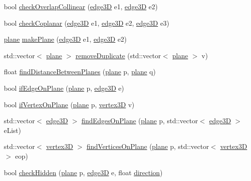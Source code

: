 \begin{DoxyCompactItemize}
\item 
bool \mbox{\hyperlink{namespacegeneral_methods_aa7662b2bcff30f8983da23da5edfc766}{check\+Overlap\+Collinear}} (\mbox{\hyperlink{structedge3_d}{edge3D}} e1, \mbox{\hyperlink{structedge3_d}{edge3D}} e2)
\item 
bool \mbox{\hyperlink{namespacegeneral_methods_a508d15a0c76920dc4f98cf8da254f9c4}{check\+Coplanar}} (\mbox{\hyperlink{structedge3_d}{edge3D}} e1, \mbox{\hyperlink{structedge3_d}{edge3D}} e2, \mbox{\hyperlink{structedge3_d}{edge3D}} e3)
\item 
\mbox{\hyperlink{structplane}{plane}} \mbox{\hyperlink{namespacegeneral_methods_a06d99f1b292d29dbdbe4734847c8d2ee}{make\+Plane}} (\mbox{\hyperlink{structedge3_d}{edge3D}} e1, \mbox{\hyperlink{structedge3_d}{edge3D}} e2)
\item 
std\+::vector$<$ \mbox{\hyperlink{structplane}{plane}} $>$ \mbox{\hyperlink{namespacegeneral_methods_a13072e8b14fcea9ae253085569062158}{remove\+Duplicate}} (std\+::vector$<$ \mbox{\hyperlink{structplane}{plane}} $>$ v)
\item 
float \mbox{\hyperlink{namespacegeneral_methods_a3bc88a001e751ad419e87bf3795ca02b}{find\+Distance\+Between\+Planes}} (\mbox{\hyperlink{structplane}{plane}} p, \mbox{\hyperlink{structplane}{plane}} q)
\item 
bool \mbox{\hyperlink{namespacegeneral_methods_a21d2e8c181e8cac3762d9ca1871d2168}{if\+Edge\+On\+Plane}} (\mbox{\hyperlink{structplane}{plane}} p, \mbox{\hyperlink{structedge3_d}{edge3D}} e)
\item 
bool \mbox{\hyperlink{namespacegeneral_methods_a330682bb45234d8de5228a7607d493d2}{if\+Vertex\+On\+Plane}} (\mbox{\hyperlink{structplane}{plane}} p, \mbox{\hyperlink{structvertex3_d}{vertex3D}} v)
\item 
std\+::vector$<$ \mbox{\hyperlink{structedge3_d}{edge3D}} $>$ \mbox{\hyperlink{namespacegeneral_methods_a9bff72be73e4d6faec798a23b8f28cb9}{find\+Edges\+On\+Plane}} (\mbox{\hyperlink{structplane}{plane}} p, std\+::vector$<$ \mbox{\hyperlink{structedge3_d}{edge3D}} $>$ e\+List)
\item 
std\+::vector$<$ \mbox{\hyperlink{structvertex3_d}{vertex3D}} $>$ \mbox{\hyperlink{namespacegeneral_methods_aa0669678cf59876e3249ddce7a0d1ce3}{find\+Vertices\+On\+Plane}} (\mbox{\hyperlink{structplane}{plane}} p, std\+::vector$<$ \mbox{\hyperlink{structvertex3_d}{vertex3D}} $>$ eop)
\item 
bool \mbox{\hyperlink{namespacegeneral_methods_a44d97941601f5929b217570ba9027d27}{check\+Hidden}} (\mbox{\hyperlink{structplane}{plane}} p, \mbox{\hyperlink{structedge3_d}{edge3D}} e, float \mbox{\hyperlink{structdirection}{direction}})

\end{DoxyCompactItemize}
